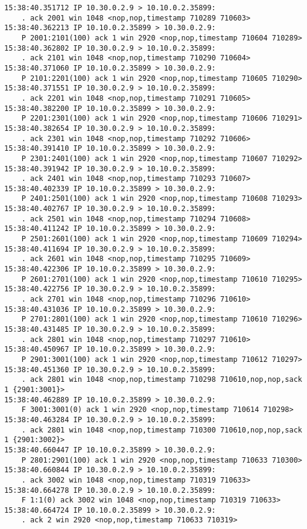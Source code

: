 \documentclass[a4paper,12pt]{article}
\begin{document}
\begin{Verbatim}
15:38:40.351712 IP 10.30.0.2.9 > 10.10.0.2.35899: 
    . ack 2001 win 1048 <nop,nop,timestamp 710289 710603>
15:38:40.362213 IP 10.10.0.2.35899 > 10.30.0.2.9: 
    P 2001:2101(100) ack 1 win 2920 <nop,nop,timestamp 710604 710289>
15:38:40.362802 IP 10.30.0.2.9 > 10.10.0.2.35899: 
    . ack 2101 win 1048 <nop,nop,timestamp 710290 710604>
15:38:40.371060 IP 10.10.0.2.35899 > 10.30.0.2.9: 
    P 2101:2201(100) ack 1 win 2920 <nop,nop,timestamp 710605 710290>
15:38:40.371551 IP 10.30.0.2.9 > 10.10.0.2.35899: 
    . ack 2201 win 1048 <nop,nop,timestamp 710291 710605>
15:38:40.382200 IP 10.10.0.2.35899 > 10.30.0.2.9: 
    P 2201:2301(100) ack 1 win 2920 <nop,nop,timestamp 710606 710291>
15:38:40.382654 IP 10.30.0.2.9 > 10.10.0.2.35899: 
    . ack 2301 win 1048 <nop,nop,timestamp 710292 710606>
15:38:40.391410 IP 10.10.0.2.35899 > 10.30.0.2.9: 
    P 2301:2401(100) ack 1 win 2920 <nop,nop,timestamp 710607 710292>
15:38:40.391942 IP 10.30.0.2.9 > 10.10.0.2.35899: 
    . ack 2401 win 1048 <nop,nop,timestamp 710293 710607>
15:38:40.402339 IP 10.10.0.2.35899 > 10.30.0.2.9: 
    P 2401:2501(100) ack 1 win 2920 <nop,nop,timestamp 710608 710293>
15:38:40.402767 IP 10.30.0.2.9 > 10.10.0.2.35899: 
    . ack 2501 win 1048 <nop,nop,timestamp 710294 710608>
15:38:40.411242 IP 10.10.0.2.35899 > 10.30.0.2.9: 
    P 2501:2601(100) ack 1 win 2920 <nop,nop,timestamp 710609 710294>
15:38:40.411694 IP 10.30.0.2.9 > 10.10.0.2.35899: 
    . ack 2601 win 1048 <nop,nop,timestamp 710295 710609>
15:38:40.422306 IP 10.10.0.2.35899 > 10.30.0.2.9: 
    P 2601:2701(100) ack 1 win 2920 <nop,nop,timestamp 710610 710295>
15:38:40.422756 IP 10.30.0.2.9 > 10.10.0.2.35899: 
    . ack 2701 win 1048 <nop,nop,timestamp 710296 710610>
15:38:40.431036 IP 10.10.0.2.35899 > 10.30.0.2.9: 
    P 2701:2801(100) ack 1 win 2920 <nop,nop,timestamp 710610 710296>
15:38:40.431485 IP 10.30.0.2.9 > 10.10.0.2.35899: 
    . ack 2801 win 1048 <nop,nop,timestamp 710297 710610>
15:38:40.450967 IP 10.10.0.2.35899 > 10.30.0.2.9: 
    P 2901:3001(100) ack 1 win 2920 <nop,nop,timestamp 710612 710297>
15:38:40.451360 IP 10.30.0.2.9 > 10.10.0.2.35899: 
    . ack 2801 win 1048 <nop,nop,timestamp 710298 710610,nop,nop,sack 1 {2901:3001}>
15:38:40.462889 IP 10.10.0.2.35899 > 10.30.0.2.9: 
    F 3001:3001(0) ack 1 win 2920 <nop,nop,timestamp 710614 710298>
15:38:40.463284 IP 10.30.0.2.9 > 10.10.0.2.35899: 
    . ack 2801 win 1048 <nop,nop,timestamp 710300 710610,nop,nop,sack 1 {2901:3002}>
15:38:40.660447 IP 10.10.0.2.35899 > 10.30.0.2.9: 
    P 2801:2901(100) ack 1 win 2920 <nop,nop,timestamp 710633 710300>
15:38:40.660844 IP 10.30.0.2.9 > 10.10.0.2.35899: 
    . ack 3002 win 1048 <nop,nop,timestamp 710319 710633>
15:38:40.664278 IP 10.30.0.2.9 > 10.10.0.2.35899: 
    F 1:1(0) ack 3002 win 1048 <nop,nop,timestamp 710319 710633>
15:38:40.664724 IP 10.10.0.2.35899 > 10.30.0.2.9: 
    . ack 2 win 2920 <nop,nop,timestamp 710633 710319>
\end{Verbatim}
\end{document}
